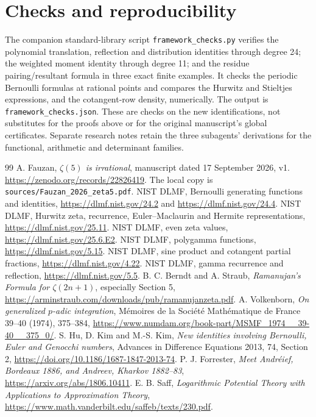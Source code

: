 \documentclass[11pt]{article}
\theoremstyle{definition}
\theoremstyle{remark}\newtheorem*{remark}{Remark}
\begin{document}
\section*{Checks and reproducibility}
The companion standard-library script \texttt{framework\_checks.py} verifies
the polynomial translation, reflection and distribution identities through
degree 24; the weighted moment identity through degree 11; and the residue
pairing/resultant formula in three exact finite examples. It checks the
periodic Bernoulli formulas at rational points and compares the Hurwitz and
Stieltjes expressions, and the cotangent-row density, numerically. The output
is \texttt{framework\_checks.json}. These are checks on the new identifications,
not substitutes for the proofs above or for the original manuscript's global
certificates. Separate research notes retain the three subagents' derivations
for the functional, arithmetic and determinant families.

\begin{thebibliography}{99}
 A. Fauzan, \emph{$\zeta(5)$ is irrational}, manuscript dated
17 September 2026, v1. \url{https://zenodo.org/records/22826419}.
The local copy is \texttt{sources/Fauzan\_2026\_zeta5.pdf}.
 NIST DLMF, Bernoulli generating functions and identities,
\url{https://dlmf.nist.gov/24.2} and \url{https://dlmf.nist.gov/24.4}.
 NIST DLMF, Hurwitz zeta, recurrence, Euler--Maclaurin and
Hermite representations, \url{https://dlmf.nist.gov/25.11}.
 NIST DLMF, even zeta values,
\url{https://dlmf.nist.gov/25.6.E2}.
 NIST DLMF, polygamma functions,
\url{https://dlmf.nist.gov/5.15}.
 NIST DLMF, sine product and cotangent partial fractions,
\url{https://dlmf.nist.gov/4.22}.
 NIST DLMF, gamma recurrence and reflection,
\url{https://dlmf.nist.gov/5.5}.
 B. C. Berndt and A. Straub, \emph{Ramanujan's Formula
for $\zeta(2n+1)$}, especially Section 5,
\url{https://arminstraub.com/downloads/pub/ramanujanzeta.pdf}.
 A. Volkenborn, \emph{On generalized $p$-adic integration},
M\'emoires de la Soci\'et\'e Math\'ematique de France 39--40 (1974), 375--384,
\url{https://www.numdam.org/book-part/MSMF_1974__39-40__375_0/}.
 S. Hu, D. Kim and M.-S. Kim, \emph{New identities involving
Bernoulli, Euler and Genocchi numbers}, Advances in Difference Equations 2013,
74, Section 2, \url{https://doi.org/10.1186/1687-1847-2013-74}.
 P. J. Forrester, \emph{Meet Andr\'eief, Bordeaux 1886,
and Andreev, Kharkov 1882--83},
\url{https://arxiv.org/abs/1806.10411}.
 E. B. Saff, \emph{Logarithmic Potential Theory with Applications
to Approximation Theory}, \url{https://www.math.vanderbilt.edu/saffeb/texts/230.pdf}.
\end{thebibliography}
\end{document}

